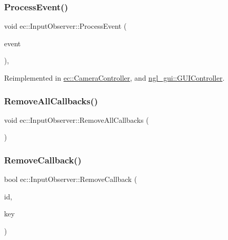 \mbox{\label{classec_1_1_input_observer_a287207f77fdc099f486daabff7fac4d5}} 
\subsubsection{\texorpdfstring{Process\+Event()}{ProcessEvent()}}
{\footnotesize\ttfamily void ec\+::\+Input\+Observer\+::\+Process\+Event (\begin{DoxyParamCaption}\item[{const \mbox{\hyperlink{structec_1_1_input_event}{Input\+Event}} \&}]{event }\end{DoxyParamCaption})\hspace{0.3cm}{\ttfamily [protected]}, {\ttfamily [virtual]}}



Reimplemented in \mbox{\hyperlink{classec_1_1_camera_controller_a0e2d455602581a484daf81bdb60a01bc}{ec\+::\+Camera\+Controller}}, and \mbox{\hyperlink{classngl__gui_1_1_g_u_i_controller_aa0f7e017d386e1e2f02359916be51137}{ngl\+\_\+gui\+::\+G\+U\+I\+Controller}}.

\mbox{\label{classec_1_1_input_observer_a878c3bd0be4886780ef284abe68637af}} 
\subsubsection{\texorpdfstring{Remove\+All\+Callbacks()}{RemoveAllCallbacks()}}
{\footnotesize\ttfamily void ec\+::\+Input\+Observer\+::\+Remove\+All\+Callbacks (\begin{DoxyParamCaption}{ }\end{DoxyParamCaption})}

\mbox{\label{classec_1_1_input_observer_ae731104af3af44b9f249132eb0d2ca6a}} 
\subsubsection{\texorpdfstring{Remove\+Callback()}{RemoveCallback()}}
{\footnotesize\ttfamily bool ec\+::\+Input\+Observer\+::\+Remove\+Callback (\begin{DoxyParamCaption}\item[{const std\+::string \&}]{id,  }\item[{\mbox{\hyperlink{namespaceec_a5de6bdb8c4b2ed6e590e721ec998f964}{Event\+Key\+\_\+T}}}]{key }\end{DoxyParamCaption})}


